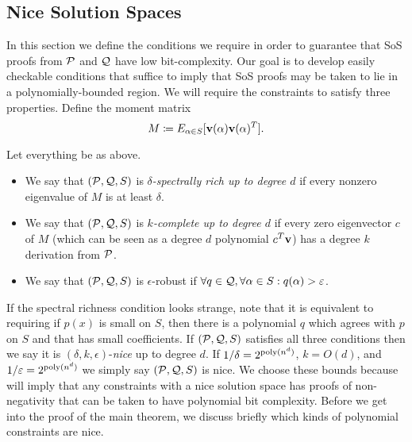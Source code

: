 \subsection{Nice Solution Spaces}
In this section we define the conditions we require in order to guarantee that SoS proofs from $\mathcal P$ and $\mathcal Q$ have low bit-complexity. Our goal is to develop easily checkable conditions that suffice to imply that SoS proofs may be taken to lie in a polynomially-bounded region. We will require the constraints to satisfy three properties. Define the moment matrix
\[M \coloneqq E_{\alpha \in S}[{\bf v}(\alpha){\bf v}(\alpha)^T].\]
\begin{definition}\label{def:nice}
Let everything be as above. 
\begin{itemize}
\item We say that $(\mathcal P, \mathcal Q, S)$ is \emph{$\delta$-spectrally rich up to degree $d$} if every nonzero eigenvalue of $M$ is at least $\delta$.
\item We say that $(\mathcal P, \mathcal Q, S)$ is \emph{$k$-complete up to degree $d$} if every zero eigenvector $c$ of $M$ (which can be seen as a degree $d$ polynomial $c^T{\bf v}$) has a degree $k$ derivation from $\mathcal P$. 
\item We say that $(\mathcal P, \mathcal Q, S)$ is $\epsilon$-robust if $\forall q \in \mathcal Q, \forall \alpha \in S: q(\alpha) > \varepsilon$.
\end{itemize}
\end{definition}
If the spectral richness condition looks strange, note that it is equivalent to requiring if $p(x)$ is small on $S$, then there is a polynomial $q$ which agrees with $p$ on $S$ and that has small coefficients. If $(\mathcal P, \mathcal Q, S)$ satisfies all three conditions then we say it is $(\delta, k, \epsilon)$-\emph{nice} up to degree $d$. If $1/\delta = 2^{\operatorname{poly}(n^d)}$, $k = O(d)$, and $1/\varepsilon = 2^{\operatorname{poly}(n^d)}$ we simply say $(\mathcal P, \mathcal Q, S)$ is nice. We choose these bounds because  will imply that any constraints with a nice solution space has proofs of non-negativity that can be taken to have polynomial bit complexity. Before we get into the proof of the main theorem, we discuss briefly which kinds of polynomial constraints are nice.

